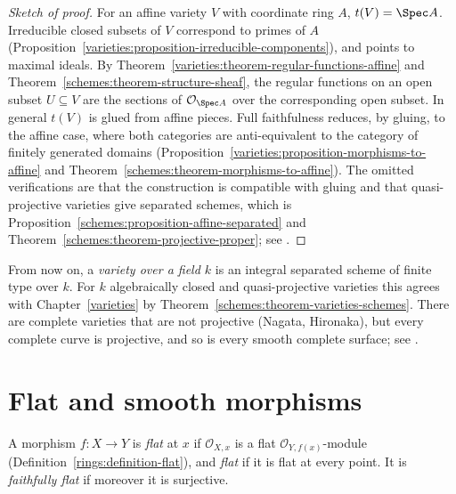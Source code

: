\begin{proof}[Sketch of proof]
For an affine variety $V$ with coordinate ring $A$, $t(V) = \Spec A$. Irreducible closed subsets of $V$ correspond to primes of $A$
(Proposition~\ref{varieties:proposition-irreducible-components}), and points to maximal ideals. By Theorem~\ref{varieties:theorem-regular-functions-affine}
and Theorem~\ref{schemes:theorem-structure-sheaf}, the regular functions on an open subset $U \subseteq V$ are the sections of $\mathcal{O}_{\Spec A}$ over the
corresponding open subset. In general $t(V)$ is glued from affine pieces. Full faithfulness reduces, by gluing, to the affine case, where both
categories are anti-equivalent to the category of finitely generated domains (Proposition~\ref{varieties:proposition-morphisms-to-affine} and
Theorem~\ref{schemes:theorem-morphisms-to-affine}). The omitted verifications are that the construction is compatible with gluing and that
quasi-projective varieties give separated schemes, which is Proposition~\ref{schemes:proposition-affine-separated} and
Theorem~\ref{schemes:theorem-projective-proper}; see \cite[Proposition II.2.6 and Proposition II.4.10]{hartshorne-ag}.
\end{proof}

\begin{remark}\label{schemes:remark-variety-convention}
From now on, a \emph{variety over a field $k$} is an integral separated scheme of finite type over $k$. For $k$ algebraically closed and quasi-projective
varieties this agrees with Chapter~\ref{varieties} by Theorem~\ref{schemes:theorem-varieties-schemes}. There are complete varieties that are not
projective (Nagata, Hironaka), but every complete curve is projective, and so is every smooth complete surface; see \cite[Appendix B]{hartshorne-ag}.
\end{remark}

\section{Flat and smooth morphisms}\label{schemes:section-flat-smooth}

\begin{definition}\label{schemes:definition-flat}
A morphism $f \colon X \to Y$ is \emph{flat} at $x$ if $\mathcal{O}_{X,x}$ is a flat $\mathcal{O}_{Y,f(x)}$-module (Definition~\ref{rings:definition-flat}),
and \emph{flat} if it is flat at every point. It is \emph{faithfully flat} if moreover it is surjective.
\end{definition}


